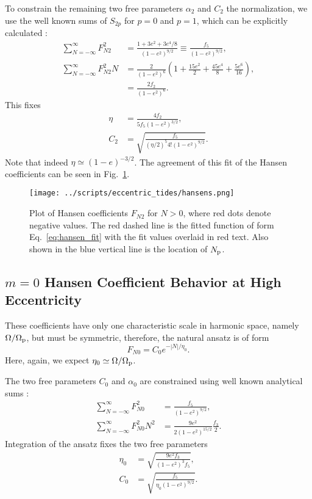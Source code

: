 \documentclass[
        fleqn,
        usenatbib,
        referee,
    ]{mnras}
\newcommand*{\abs}[1]{\left|#1\right|}
\newcommand*{\p}[1]{\left(#1\right)}
\begin{document}
To constrain the remaining two free parameters $\alpha_{2}$ and $C_2$ the
normalization, we use the well known sums of $S_{2p}$ for $p = 0$ and $p = 1$,
which can be explicitly calculated \citep{hut,sl,vlf}:
\begin{align}
    \sum\limits_{N = -\infty}^\infty F_{N2}^2
        &= \frac{1 + 3e^2 + 3e^4/8}{\p{1 - e^2}^{9/2}}
            \equiv \frac{f_5}{\p{1 - e^2}^{9/2}},\\
    \sum\limits_{N = -\infty}^\infty F_{N2}^2N
        &= \frac{2}{\p{1 - e^2}^6}\p{1 + \frac{15e^2}{2}
            + \frac{45 e^4}{8} + \frac{5e^6}{16}},\\
        &= \frac{2f_2}{\p{1 - e^2}^6}.
\end{align}
This fixes
\begin{align}
    \eta &= \frac{4f_2}{5f_5\p{1 - e^2}^{3/2}},\\
    C_2 &= \sqrt{\frac{f_5}{\p{\eta/2}^5 4! \p{1 - e^2}^{9/2}}}.
\end{align}
Note that indeed $\eta \simeq \p{1 - e}^{-3/2}$. The agreement of this fit of
the Hansen coefficients can be seen in Fig.~\ref{fig:hansens}.
\begin{figure}
    \centering
    \texttt{[image: ../scripts/eccentric\_tides/hansens.png]}
    \caption{Plot of Hansen coefficients $F_{N2}$ for $N > 0$, where red dots
    denote negative values. The red dashed line is the fitted function of form
    Eq.~\eqref{eq:hansen_fit} with the fit values overlaid in red text. Also shown
    in the blue vertical line is the location of $N_{\rm
    p}$.}\label{fig:hansens}
\end{figure}

\subsection{$m = 0$ Hansen Coefficient Behavior at High Eccentricity}

These coefficients have only one characteristic scale in harmonic space, namely
$\Omega / \Omega_{\rm p}$, but must be symmetric, therefore, the natural
ansatz is of form
\begin{equation}
    F_{N0} = C_0 e^{-\abs{N} / \eta_0}.
\end{equation}
Here, again, we expect $\eta_0 \simeq \Omega / \Omega_{\rm p}$.

The two free parameters $C_0$ and $\alpha_0$ are constrained using well known
analytical sums \citep{hut,sl,vlf}:
\begin{align}
    \sum\limits_{N = -\infty}^\infty F_{N0}^2 &= \frac{f_5}{\p{1 - e^2}^{9/2}}
        ,\\
    \sum\limits_{N = -\infty}^\infty F_{N0}^2 N^2
        &= \frac{9e^2}{2\p{1 - e^2}^{15/2}}
            \frac{f_3}{2}.
\end{align}
Integration of the ansatz fixes the two free parameters
\begin{align}
    \eta_0 &= \sqrt{\frac{9e^2f_3}{\p{1 - e^2}^{3}f_5}},\\
    C_0 &= \sqrt{\frac{f_5}{\eta_0\p{1 - e^2}^{9/2}}}.
\end{align}
\end{document}
